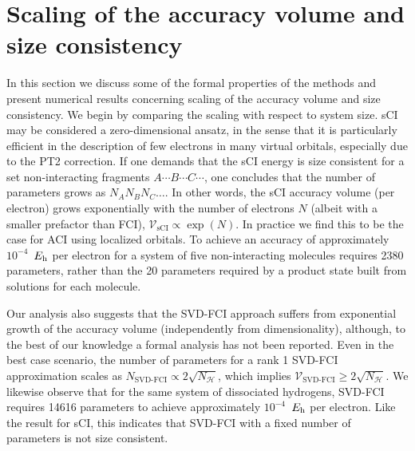 \documentclass[aip,jcp,amsmath,amssymb, reprint]{revtex4-1}
\newcommand*{\Eh}{$E_{\rm h}$\xspace}
\begin{document}
\section{\label{sec:comparison}Scaling of the accuracy volume and size consistency}
In this section we discuss some of the formal properties of the methods and present numerical results concerning scaling of the accuracy volume and size consistency.
We begin by comparing the scaling with respect to system size.
sCI may be considered a zero-dimensional ansatz, in the sense that it is particularly efficient in the description of few electrons in many virtual orbitals, especially due to the PT2 correction.
If one demands that the sCI energy is size consistent for a set non-interacting fragments $A\cdots B \cdots C\cdots$, one concludes that the number of parameters grows as $N_A N_B N_C \ldots$.
In other words, the sCI accuracy volume (per electron) grows exponentially with the number of electrons $N$ (albeit with a smaller prefactor than FCI), $\mathcal{V}_{\text{sCI}} \propto \exp(N)$.
In practice we find this to be the case for ACI using localized orbitals.
To achieve an accuracy of approximately $10^{-4}$~\Eh per electron for a system of five non-interacting  molecules requires 2380 parameters, rather than the 20 parameters required by a product state built from solutions for each  molecule.

Our analysis also suggests that the SVD-FCI approach suffers from exponential growth of the accuracy volume (independently from  dimensionality), although, to the best of our knowledge a formal analysis has not been reported. 
Even in the best case scenario, the number of parameters for a rank 1 SVD-FCI approximation scales as $N_{\text{SVD-FCI}} \propto 2 \sqrt{N_{\mathcal{H}}}$, which implies $\mathcal{V}_{\text{SVD-FCI}} \geq 2 \sqrt{N_{\mathcal{H}}}$.
We likewise observe that for the same system of dissociated hydrogens, SVD-FCI requires 14616 parameters to achieve approximately $10^{-4}$~\Eh per electron.
Like the result for sCI, this indicates that SVD-FCI with a fixed number of parameters is not size consistent.
\end{document}
